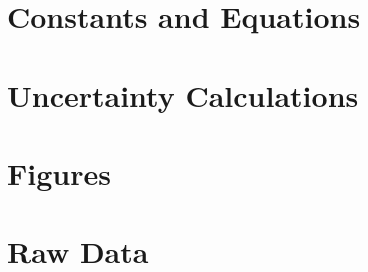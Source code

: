 \documentclass[12pt,a4paper]{article}
\begin{document}
    
    \appendix
    \section{Constants and Equations}
    
    \section{Uncertainty Calculations} \label{sec:uncertainty}

    \section{Figures} \label{sec:figures}

    \section{Raw Data} \label{sec:data}
        
\end{document}
